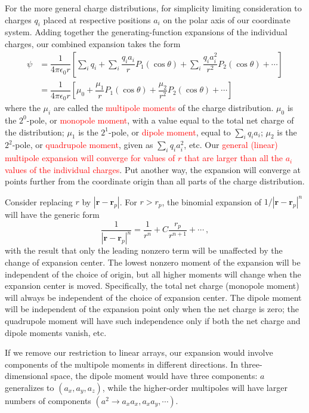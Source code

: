 \documentclass[12pt,a4paper]{article}
\renewcommand{\vec}[1]{\boldsymbol{#1}}
\begin{document}
For the more general charge distributions, for simplicity limiting consideration to charges $q_i$ placed at respective positions $a_i$ on the polar axis of our coordinate system. Adding together the generating-function expansions of the individual charges, our combined expansion takes the form
\begin{align}
\nonumber \psi &= \dfrac{1}{4\pi \epsilon_0 r} \left[\sum_i q_i +\sum_i \dfrac{q_i a_i}{r} P_1(\cos \theta) +\sum_i \dfrac{q_i a_i^2}{r^2} P_2(\cos \theta) + \cdots \right] \\
&= \dfrac{1}{4\pi \epsilon_0 r} \left[\mu_0 +\dfrac{\mu_1}{r} P_1(\cos \theta) +\dfrac{\mu_2}{r^2} P_2(\cos \theta) +\cdots \right]
\end{align}
where the $\mu_i$ are called the \textcolor{red}{multipole moments} of the charge distribution. $\mu_0$ is the $2^0$-pole, or \textcolor{red}{monopole moment}, with a value equal to the total net charge of the distribution; $\mu_1$ is the $2^1$-pole, or \textcolor{red}{dipole moment}, equal to $\sum_i q_i a_i$; $\mu_2$ is the $2^2$-pole, or \textcolor{red}{quadrupole moment}, given as $\sum_i q_i a_i^2$, etc. Our \textcolor{red}{general (linear) multipole expansion will converge for values of $r$ that are larger than all the $a_i$ values of the individual charges}. Put another way, the expansion will converge at points further from the coordinate origin than all parts of the charge distribution.

Consider replacing $r$ by $|\vec{r} - \vec{r}_p|$. For $r > r_p$, the binomial expansion of $1/|\vec{r} -\vec{r}_p|^n$ will have the generic form
\begin{equation}
\dfrac{1}{|\vec{r} - \vec{r}_p|^n} = \dfrac{1}{r^n} + C \dfrac{r_p}{r^{n+1}} + \cdots ~,
\end{equation}
with the result that only the leading nonzero term will be unaffected by the change of expansion center. The lowest nonzero moment of the expansion will be independent of the choice of origin, but all higher moments will change when the expansion center is moved. Specifically, the total net charge (monopole moment) will always be independent of the choice of expansion center. The dipole moment will be independent of the expansion point only when the net charge is zero; the quadrupole moment will have such independence only if both the net charge and dipole moments vanish, etc.

If we remove our restriction to linear arrays, our expansion would involve components of the multipole moments in different directions. In three-dimensional space, the dipole moment would have three components: $a$ generalizes to $(a_x , a_y , a_z )$, while the higher-order multipoles will have larger numbers of components $(a^2 \rightarrow a_x a_x , a_x a_y , \cdots)$. 
\end{document}
